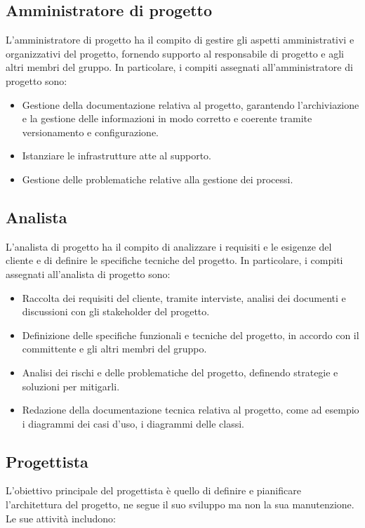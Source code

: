 \subsection{Amministratore di progetto}
L'amministratore di progetto ha il compito di gestire gli aspetti amministrativi e organizzativi del progetto, fornendo supporto al responsabile di progetto e agli altri membri del gruppo. In particolare, i compiti assegnati all'amministratore di progetto sono:

\begin{itemize}
\item Gestione della documentazione relativa al progetto, garantendo l'archiviazione e la gestione delle informazioni in modo corretto e coerente tramite versionamento e configurazione.
\item Istanziare le infrastrutture atte al supporto.
\item Gestione delle problematiche relative alla gestione dei processi.
\end{itemize}

\subsection{Analista}
L'analista di progetto ha il compito di analizzare i requisiti e le esigenze del cliente e di definire le specifiche tecniche del progetto. In particolare, i compiti assegnati all'analista di progetto sono:

\begin{itemize}
\item Raccolta dei requisiti del cliente, tramite interviste, analisi dei documenti e discussioni con gli stakeholder del progetto.
\item Definizione delle specifiche funzionali e tecniche del progetto, in accordo con il committente e gli altri membri del gruppo.
\item Analisi dei rischi e delle problematiche del progetto, definendo strategie e soluzioni per mitigarli.
\item Redazione della documentazione tecnica relativa al progetto, come ad esempio i diagrammi dei casi d'uso, i diagrammi delle classi.
\end{itemize}

\subsection{Progettista}
L'obiettivo principale del progettista è quello di definire e pianificare l'architettura del progetto, ne segue il suo sviluppo ma non la sua manutenzione. Le sue attività includono:

